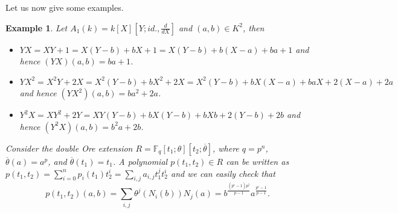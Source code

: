 \documentclass{amsproc}
\newtheorem{example}[theorem]{Example}
\numberwithin{equation}{section}
\begin{document}
\noindent Let us now give some examples.

\begin{example}
	
	{\rm
		
		\item[(1)] Let $A_1(k)=k[X][Y;id.,\frac{d}{dX}]$ and $(a,b)\in K^2$, then
		\begin{itemize}
			\item $YX=XY+1=X(Y-b)+bX+1=X(Y-b)+b(X-a)+ba+1$ and hence $(YX)(a,b)=ba + 1$.
			\item $YX^2=X^2Y+2X=X^2(Y-b)+bX^2+2X=X^2(Y-b)+bX(X-a)+baX+2(X-a)+2a$ and hence $(YX^2)(a,b)=ba^2+2a$.
			\item $Y^2X=XY^2+2Y=XY(Y-b)+bX(Y-b)+bXb+2(Y-b)+2b$ and hence $(Y^2X)(a,b)=b^2a + 2b$.
		\end{itemize}
		\item[(2)] Consider the double Ore extension $R=\mathbb F_q[t_1;\theta][t_2;\overline{\theta}]$, where $q=p^n$, $\overline{\theta}(a)=a^p$, and $\overline{\theta}(t_1)=t_1$.  A polynomial $p(t_1,t_2)\in R$ can be written as $p(t_1,t_2)=\sum_{i=0}^{n}p_i(t_1)t_2^i=\sum_{i,j}a_{i,j}t_1^jt_2^i$ and we can easily check that $$p(t_1,t_2)(a,b)=\sum_{i,j}\theta^j(N_i(b))N_j(a)=b^{\frac{(p^i-1)p^j}{p-1}}a^{\frac{p^i-1}{p-1}}.$$
	}	 
\end{example}
\end{document}
